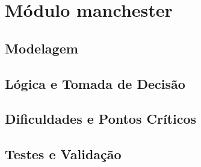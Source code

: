 ﻿%
\section{Módulo manchester}
\subsection{Modelagem}
\subsection{Lógica e Tomada de Decisão}
\subsection{Dificuldades e Pontos Críticos}
\subsection{Testes e Validação}


